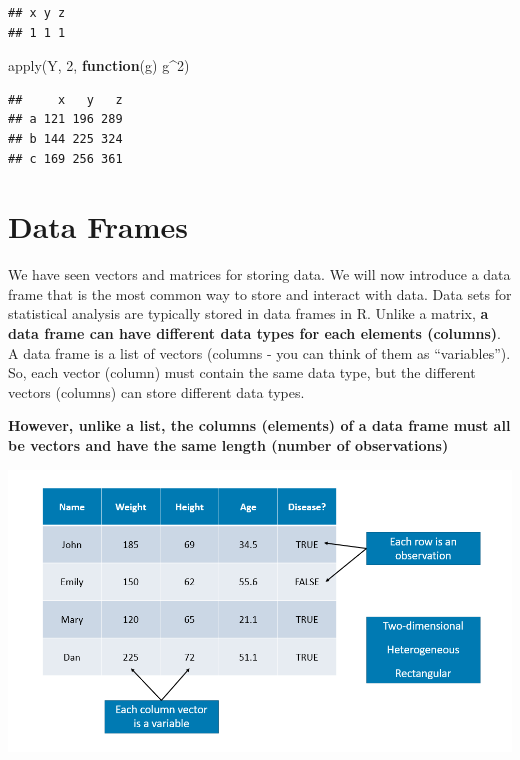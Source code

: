 \documentclass[
]{book}
\newenvironment{Shaded}{\begin{snugshade}}{\end{snugshade}}
\newcommand{\ControlFlowTok}[1]{\textcolor[rgb]{0.13,0.29,0.53}{\textbf{#1}}}
\newcommand{\DecValTok}[1]{\textcolor[rgb]{0.00,0.00,0.81}{#1}}
\newcommand{\FunctionTok}[1]{\textcolor[rgb]{0.00,0.00,0.00}{#1}}
\newcommand{\NormalTok}[1]{#1}
\newcommand{\SpecialCharTok}[1]{\textcolor[rgb]{0.00,0.00,0.00}{#1}}
\begin{document}
\begin{verbatim}
## x y z 
## 1 1 1
\end{verbatim}

\begin{Shaded}
\begin{Highlighting}[]
\FunctionTok{apply}\NormalTok{(Y, }\DecValTok{2}\NormalTok{, }\ControlFlowTok{function}\NormalTok{(g) g}\SpecialCharTok{\^{}}\DecValTok{2}\NormalTok{)}
\end{Highlighting}
\end{Shaded}

\begin{verbatim}
##     x   y   z
## a 121 196 289
## b 144 225 324
## c 169 256 361
\end{verbatim}

\hypertarget{data-frames}{%
\section{Data Frames}\label{data-frames}}

We have seen vectors and matrices for storing data. We will now introduce a data frame that is the most common way to store and interact with data. Data sets for statistical analysis are typically stored in data frames in R. Unlike a matrix, \textbf{a data frame can have different data types for each elements (columns)}. A data frame is a list of vectors (columns - you can think of them as ``variables''). So, each vector (column) must contain the same data type, but the different vectors (columns) can store different data types.

\textbf{However, unlike a list, the columns (elements) of a data frame must all be vectors and have the same length (number of observations)}

\includegraphics[width=13.56in]{png/dataframe}
\end{document}
